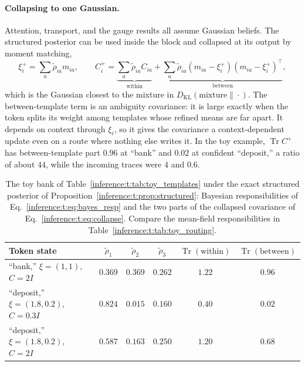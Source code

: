 \documentclass[11pt]{article}
\theoremstyle{definition}
\theoremstyle{remark}
\providecommand{\KL}{D_{\mathrm{KL}}}
\providecommand{\Tr}{\operatorname{Tr}}
\begin{document}
\paragraph{Collapsing to one Gaussian.}
Attention, transport, and the gauge results all assume Gaussian beliefs. The structured posterior can be used inside the block and collapsed at its output by moment matching,
\begin{equation}
\xi_i^{+}=\sum_a\tilde\rho_{ia}m_{ia},
\qquad
C_i^{+}=\underbrace{\sum_a\tilde\rho_{ia}C_{ia}}_{\text{within}}
+\underbrace{\sum_a\tilde\rho_{ia}(m_{ia}-\xi_i^{+})(m_{ia}-\xi_i^{+})^{\top}}_{\text{between}},
\label{inference:t:eq:collapse}
\end{equation}
which is the Gaussian closest to the mixture in $\KL(\text{mixture}\|\cdot)$. The between-template term is an ambiguity covariance: it is large exactly when the token splits its weight among templates whose refined means are far apart. It depends on context through $\xi_i$, so it gives the covariance a context-dependent update even on a route where nothing else writes it. In the toy example, $\Tr C^{+}$ has between-template part $0.96$ at ``bank'' and $0.02$ at confident ``deposit,'' a ratio of about $44$, while the incoming traces were $4$ and $0.6$.

\begin{table}[h]
\centering
\begin{tabular}{@{}lccccc@{}}
\toprule
Token state & $\tilde\rho_{1}$ & $\tilde\rho_{2}$ & $\tilde\rho_{3}$ & $\Tr(\text{within})$ & $\Tr(\text{between})$ \\
\midrule
``bank,'' $\xi=(1,1)$, $C=2I$ & $0.369$ & $0.369$ & $0.262$ & $1.22$ & $0.96$ \\
``deposit,'' $\xi=(1.8,0.2)$, $C=0.3I$ & $0.824$ & $0.015$ & $0.160$ & $0.40$ & $0.02$ \\
``deposit,'' $\xi=(1.8,0.2)$, $C=2I$ & $0.587$ & $0.163$ & $0.250$ & $1.20$ & $0.68$ \\
\bottomrule
\end{tabular}
\caption{The toy bank of Table~\ref{inference:t:tab:toy_templates} under the exact structured posterior of Proposition~\ref{inference:t:prop:structured}: Bayesian responsibilities of Eq.~\eqref{inference:t:eq:bayes_resp} and the two parts of the collapsed covariance of Eq.~\eqref{inference:t:eq:collapse}. Compare the mean-field responsibilities in Table~\ref{inference:t:tab:toy_routing}.}
\label{inference:t:tab:structured}
\end{table}
\end{document}
